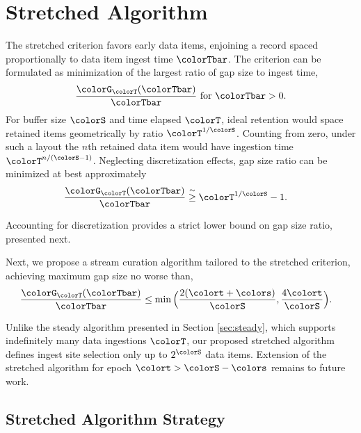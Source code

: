 \section{Stretched Algorithm} \label{sec:stretched}

The stretched criterion favors early data items, enjoining a record spaced proportionally to data item ingest time $\colorTbar$.
The criterion can be formulated as minimization of the largest ratio of gap size to ingest time,
\begin{align*}
\frac{\colorG_{\colorT}(\colorTbar)}{\colorTbar} \text{ for } \colorTbar > 0.
\end{align*}
For buffer size $\colorS$ and time elapsed $\colorT$, ideal retention would space retained items geometrically by ratio $\colorT^{1/\colorS}$.
Counting from zero, under such a layout the $n$th retained data item would have ingestion time $\colorT^{n/(\colorS - 1)}$.
Neglecting discretization effects, gap size ratio can be minimized at best approximately
\begin{align*}
\frac{\colorG_{\colorT}(\colorTbar)}{\colorTbar}
&\stackrel{\sim}{\geq}
\colorT^{1/\colorS} - 1.
\end{align*}

Accounting for discretization provides a strict lower bound on gap size ratio, presented next.



Next, we propose a stream curation algorithm tailored to the stretched criterion, achieving maximum gap size no worse than,
\begin{align*}
\frac{\colorG_{\colorT}(\colorTbar)}{\colorTbar}
&\leq
\min\Big(
  \frac{2(\colort + \colors)}{\colorS},
  \frac{4\colort}{\colorS}
\Big).
\end{align*}

Unlike the steady algorithm presented in Section \ref{sec:steady}, which supports indefinitely many data ingestions $\colorT$, our proposed stretched algorithm defines ingest site selection only up to $2^{\colorS}$ data items.
Extension of the stretched algorithm for epoch $\colort > \colorS - \colors$ remains to future work.

\subsection{Stretched Algorithm Strategy}
\label{sec:stretched-strategy}



